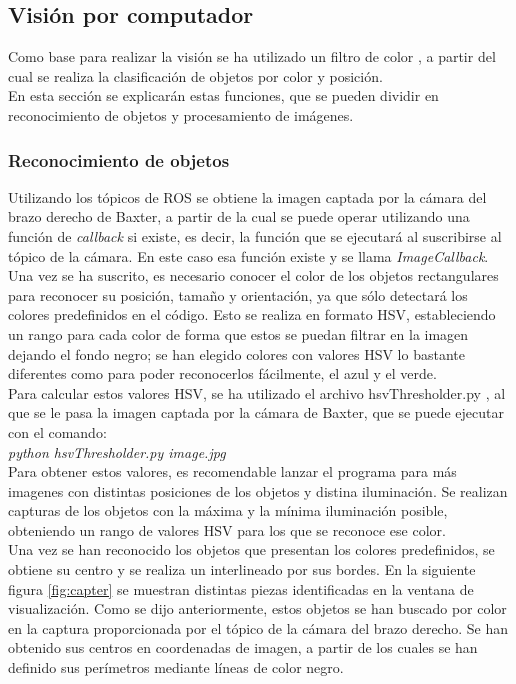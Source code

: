 \subsection{Visión por computador}
\noindent Como base para realizar la visión se ha utilizado un filtro de color \cite{maik}, a partir del cual se realiza la clasificación de objetos por color y posición. \\
\noindent En esta sección se explicarán estas funciones, que se pueden dividir en reconocimiento de objetos y procesamiento de imágenes. \\

\subsubsection{Reconocimiento de objetos}
\noindent Utilizando los tópicos de ROS se obtiene la imagen captada por la cámara del brazo derecho de Baxter, a partir de la cual se puede operar utilizando una función de \textit{callback} si existe, es decir, la función que se ejecutará al suscribirse al tópico de la cámara. En este caso esa función existe y se llama \textit{ImageCallback}. \\
\noindent Una vez se ha suscrito, es necesario conocer el color de los objetos rectangulares para reconocer su posición, tamaño y orientación, ya que sólo detectará los colores predefinidos en el código. Esto se realiza en formato HSV, estableciendo un rango para cada color de forma que estos se puedan filtrar en la imagen dejando el fondo negro; se han elegido colores con valores HSV lo bastante diferentes como para poder reconocerlos fácilmente, el azul y el verde. \\

\noindent Para calcular estos valores HSV, se ha utilizado el archivo hsvThresholder.py \cite{thpy}, al que se le pasa la imagen captada por la cámara de Baxter, que se puede ejecutar con el comando: \\

\textit{python hsvThresholder.py image.jpg} \\

\noindent Para obtener estos valores, es recomendable lanzar el programa para más imagenes con distintas posiciones de los objetos y distina iluminación. Se realizan capturas de los objetos con la máxima y la mínima iluminación posible, obteniendo un rango de valores HSV para los que se reconoce ese color. \\

\noindent Una vez se han reconocido los objetos que presentan los colores predefinidos, se obtiene su centro y se realiza un interlineado por sus bordes. En la siguiente figura \ref{fig:capter} se muestran distintas piezas identificadas en la ventana de visualización. Como se dijo anteriormente, estos objetos se han buscado por color en la captura proporcionada por el tópico de la cámara del brazo derecho. Se han obtenido sus centros en coordenadas de imagen, a partir de los cuales se han definido sus perímetros mediante líneas de color negro. \\

